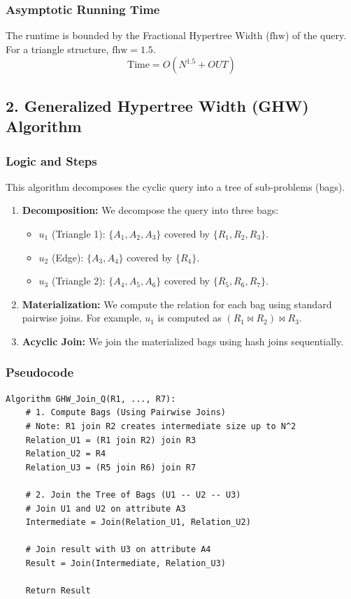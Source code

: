 \documentclass[11pt]{article}
\begin{document}
\subsubsection*{Asymptotic Running Time}
The runtime is bounded by the Fractional Hypertree Width ($\text{fhw}$) of the query. For a triangle structure, $\text{fhw} = 1.5$.
\[ \text{Time} = O(N^{1.5} + OUT) \]

\subsection*{2. Generalized Hypertree Width (GHW) Algorithm}

\subsubsection*{Logic and Steps}
This algorithm decomposes the cyclic query into a tree of sub-problems (bags).
\begin{enumerate}
    \item \textbf{Decomposition:} We decompose the query into three bags:
        \begin{itemize}
            \item $u_1$ (Triangle 1): $\{A_1, A_2, A_3\}$ covered by $\{R_1, R_2, R_3\}$.
            \item $u_2$ (Edge): $\{A_3, A_4\}$ covered by $\{R_4\}$.
            \item $u_3$ (Triangle 2): $\{A_4, A_5, A_6\}$ covered by $\{R_5, R_6, R_7\}$.
        \end{itemize}
    \item \textbf{Materialization:} We compute the relation for each bag using standard pairwise joins. For example, $u_1$ is computed as $(R_1 \bowtie R_2) \bowtie R_3$.
    \item \textbf{Acyclic Join:} We join the materialized bags using hash joins sequentially.
\end{enumerate}

\subsubsection*{Pseudocode}
\begin{verbatim}
Algorithm GHW_Join_Q(R1, ..., R7):
    # 1. Compute Bags (Using Pairwise Joins)
    # Note: R1 join R2 creates intermediate size up to N^2
    Relation_U1 = (R1 join R2) join R3
    Relation_U2 = R4
    Relation_U3 = (R5 join R6) join R7
    
    # 2. Join the Tree of Bags (U1 -- U2 -- U3)
    # Join U1 and U2 on attribute A3
    Intermediate = Join(Relation_U1, Relation_U2)
    
    # Join result with U3 on attribute A4
    Result = Join(Intermediate, Relation_U3)
    
    Return Result
\end{verbatim}
\end{document}
